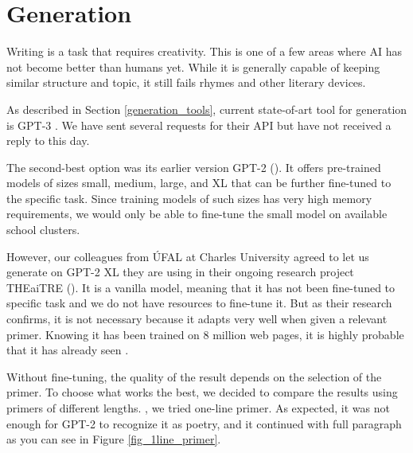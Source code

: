 \chapter{Generation}\label{generation}
Writing  is a task that requires creativity. This is one of a few areas where AI has not become better than humans yet. While it is generally capable of keeping similar structure and topic, it still fails  rhymes and other literary devices.

As described in Section \ref{generation_tools},  current state-of-art tool for generation is GPT-3 \citep{brown2020gpt3}. We have sent several requests for their API but have not received a reply to this day.

The second-best option was its earlier version GPT-2 (\cite{radford2019gpt2}). It offers pre-trained models of sizes small, medium, large, and XL that can be further fine-tuned to the specific task. Since training models of such sizes has very high memory requirements, we would only be able to fine-tune the small model on available school clusters. 

However, our colleagues from ÚFAL  at  Charles University agreed to let us generate on GPT-2 XL  they are using in their ongoing research project THEaiTRE (\cite{rosa2021theaitre}). It is a vanilla model, meaning that it has not been fine-tuned to  specific task and we do not have resources to fine-tune it. But as their research confirms, it is not necessary because it adapts very well when given a relevant primer. Knowing it has been trained on 8 million web pages, it is highly probable that it has already seen . 

Without fine-tuning, the quality of the result depends on the selection of the primer. To choose what works the best, we decided to compare the results using primers of different lengths. , we tried one-line primer. As expected, it was not enough for GPT-2 to recognize it as poetry, and it continued with full paragraph as you can see in Figure \ref{fig_1line_primer}.

